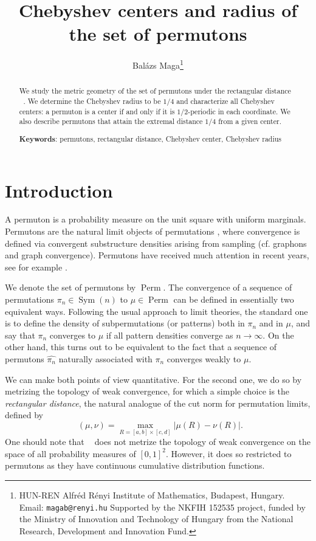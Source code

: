 \documentclass{article}
\title{Chebyshev centers and radius of the set of permutons}
\author{Bal\'azs Maga\thanks{HUN-REN Alfréd Rényi Institute of Mathematics, Budapest, Hungary. Email: \texttt{magab@renyi.hu}
\newline Supported by the NKFIH 152535 project, funded by the Ministry of Innovation and Technology of Hungary from the National Research, Development and Innovation Fund.}}
\date{}
\newcommand{\Perm}{\mathop{\mathrm{Perm}}}
\newcommand{\Sym}{\mathop{\mathrm{Sym}}}
\newcommand{\ds}{\mathop{d_\square}}
\theoremstyle{definition}
\begin{document}
\maketitle
\begin{abstract}
We study the metric geometry of the set of permutons under the rectangular distance $\ds$.
We determine the Chebyshev radius to be $1/4$ and characterize all Chebyshev centers: a permuton is a center if and only if it is $1/2$-periodic in each coordinate.
We also describe permutons that attain the extremal distance $1/4$ from a given center.

\noindent \textbf{Keywords}: permutons, rectangular distance, Chebyshev center, Chebyshev radius
\end{abstract}

\section{Introduction}

A permuton is a probability measure on the unit square with uniform marginals. Permutons are the natural limit objects of permutations \cite{HOPPEN201393}, where convergence is defined via convergent substructure densities arising from sampling (cf. graphons and graph convergence). Permutons have received much attention in recent years, see for example \cite{ALON2022102361, BASSINO2022108513, GLEBOV2015112, Rahman2019, Jasinska2025}.

We denote the set of permutons by $\Perm$. The convergence of a sequence of permutations $\pi_n\in \Sym(n)$ to $\mu\in\Perm$ can be defined in essentially two equivalent ways. Following the usual approach to limit theories, the standard one is to define the density of subpermutations (or patterns) both in $\pi_n$ and in $\mu$, and say that $\pi_n$ converges to $\mu$ if all pattern densities converge as $n\to\infty$. On the other hand, this turns out to be equivalent to the fact that a sequence of permutons $\widehat{\pi_n}$ naturally associated with $\pi_n$ converges weakly to $\mu$. 

We can make both points of view quantitative. For the second one, we do so by metrizing the topology of weak convergence, for which a simple choice is the \emph{rectangular distance}, the natural analogue of the cut norm for permutation limits, defined by
$$\ds(\mu, \nu)=\max_{R=[a,b]\times [c, d]}|\mu(R)-\nu(R)|.$$
One should note that $\ds$ does not metrize the topology of weak convergence on the space of all probability measures of $[0 ,1]^2$. However, it does so restricted to permutons as they have continuous cumulative distribution functions.
\end{document}
